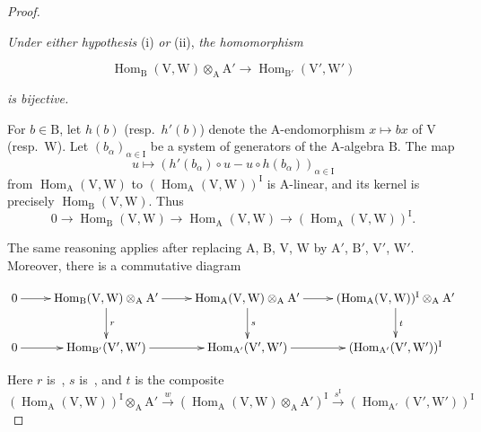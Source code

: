 \begin{proof}
\begin{env}[2.5.8.3]
\label{IV.2.5.8.3}
\emph{Under either hypothesis} (i) \emph{or} (ii), \emph{the
homomorphism}
\end{env}

\begin{env}[2.5.8.4]
\label{IV.2.5.8.4}
\[
  \operatorname{Hom}_{\mathrm{B}}(\mathrm{V},\mathrm{W})\otimes_{\mathrm{A}}\mathrm{A}' \to \operatorname{Hom}_{\mathrm{B}'}(\mathrm{V}',\mathrm{W}')
\]
\end{env}

\emph{is bijective.}

For $b\in\mathrm{B}$, let $h(b)$ \textnormal{(}resp.\ $h'(b)$\textnormal{)}
denote the $\mathrm{A}$-endomorphism $x\mapsto bx$ of $\mathrm{V}$
\textnormal{(}resp.\ $\mathrm{W}$\textnormal{)}. Let
$(b_\alpha)_{\alpha\in\mathrm{I}}$ be a system of generators of the
$\mathrm{A}$-algebra $\mathrm{B}$. The map
\[
  u\mapsto (h'(b_\alpha)\circ u - u\circ h(b_\alpha))_{\alpha\in\mathrm{I}}
\]
from $\operatorname{Hom}_{\mathrm{A}}(\mathrm{V},\mathrm{W})$ to
$(\operatorname{Hom}_{\mathrm{A}}(\mathrm{V},\mathrm{W}))^{\mathrm{I}}$
is $\mathrm{A}$-linear, and its kernel is precisely
$\operatorname{Hom}_{\mathrm{B}}(\mathrm{V},\mathrm{W})$. Thus
\[
  0 \to \operatorname{Hom}_{\mathrm{B}}(\mathrm{V},\mathrm{W}) \to \operatorname{Hom}_{\mathrm{A}}(\mathrm{V},\mathrm{W}) \to (\operatorname{Hom}_{\mathrm{A}}(\mathrm{V},\mathrm{W}))^{\mathrm{I}}.
\]

The same reasoning applies after replacing $\mathrm{A}$, $\mathrm{B}$,
$\mathrm{V}$, $\mathrm{W}$ by $\mathrm{A}'$, $\mathrm{B}'$,
$\mathrm{V}'$, $\mathrm{W}'$. Moreover, there is a commutative diagram

\begin{env}[2.5.8.5]
\label{IV.2.5.8.5}
\[
\xymatrix{
  0 \ar[r] & \operatorname{Hom}_{\mathrm{B}}(\mathrm{V},\mathrm{W})\otimes_{\mathrm{A}}\mathrm{A}' \ar[r] \ar[d]^{r} & \operatorname{Hom}_{\mathrm{A}}(\mathrm{V},\mathrm{W})\otimes_{\mathrm{A}}\mathrm{A}' \ar[r] \ar[d]^{s} & (\operatorname{Hom}_{\mathrm{A}}(\mathrm{V},\mathrm{W}))^{\mathrm{I}}\otimes_{\mathrm{A}}\mathrm{A}' \ar[d]^{t} \\
  0 \ar[r] & \operatorname{Hom}_{\mathrm{B}'}(\mathrm{V}',\mathrm{W}') \ar[r] & \operatorname{Hom}_{\mathrm{A}'}(\mathrm{V}',\mathrm{W}') \ar[r] & (\operatorname{Hom}_{\mathrm{A}'}(\mathrm{V}',\mathrm{W}'))^{\mathrm{I}}
}
\]
\end{env}

Here $r$ is~, $s$ is~, and $t$ is
the composite
\[
  (\operatorname{Hom}_{\mathrm{A}}(\mathrm{V},\mathrm{W}))^{\mathrm{I}}\otimes_{\mathrm{A}}\mathrm{A}' \xrightarrow{w} (\operatorname{Hom}_{\mathrm{A}}(\mathrm{V},\mathrm{W})\otimes_{\mathrm{A}}\mathrm{A}')^{\mathrm{I}} \xrightarrow{s^{\mathrm{I}}} (\operatorname{Hom}_{\mathrm{A}'}(\mathrm{V}',\mathrm{W}'))^{\mathrm{I}}
\]


\end{proof}
